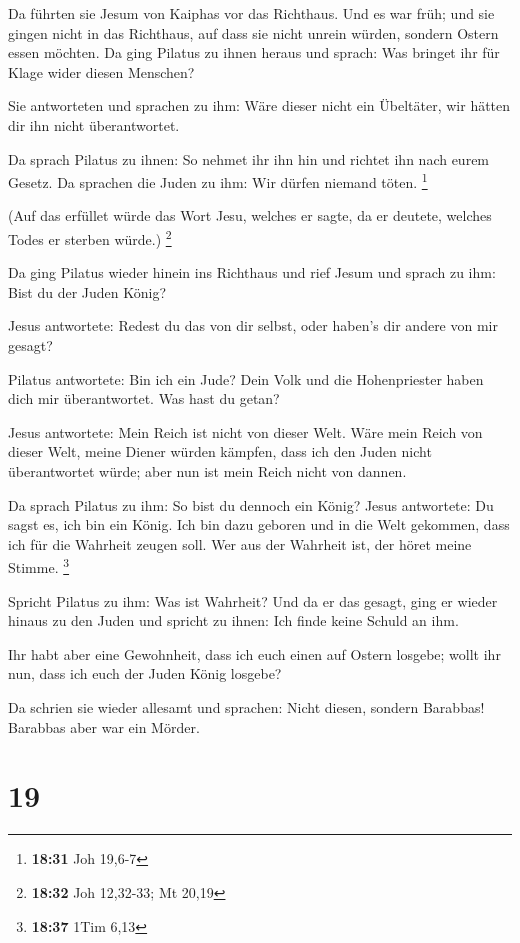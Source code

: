  Da führten sie Jesum von Kaiphas vor das Richthaus. Und
es war früh; und sie gingen nicht in das Richthaus, auf dass sie nicht
unrein würden, sondern Ostern essen möchten.  Da ging
Pilatus zu ihnen heraus und sprach: Was bringet ihr für Klage wider
diesen Menschen?

 Sie antworteten und sprachen zu ihm: Wäre dieser nicht
ein Übeltäter, wir hätten dir ihn nicht überantwortet.

 Da sprach Pilatus zu ihnen: So nehmet ihr ihn hin und
richtet ihn nach eurem Gesetz. Da sprachen die Juden zu ihm: Wir dürfen
niemand töten. \footnote{\textbf{18:31} Joh 19,6-7}

 (Auf das erfüllet würde das Wort Jesu, welches er sagte,
da er deutete, welches Todes er sterben würde.) \footnote{\textbf{18:32}
  Joh 12,32-33; Mt 20,19}

 Da ging Pilatus wieder hinein ins Richthaus und rief
Jesum und sprach zu ihm: Bist du der Juden König?

 Jesus antwortete: Redest du das von dir selbst, oder
haben's dir andere von mir gesagt?

 Pilatus antwortete: Bin ich ein Jude? Dein Volk und die
Hohenpriester haben dich mir überantwortet. Was hast du getan?

 Jesus antwortete: Mein Reich ist nicht von dieser Welt.
Wäre mein Reich von dieser Welt, meine Diener würden kämpfen, dass ich
den Juden nicht überantwortet würde; aber nun ist mein Reich nicht von
dannen.

 Da sprach Pilatus zu ihm: So bist du dennoch ein König?
Jesus antwortete: Du sagst es, ich bin ein König. Ich bin dazu geboren
und in die Welt gekommen, dass ich für die Wahrheit zeugen soll. Wer aus
der Wahrheit ist, der höret meine Stimme. \footnote{\textbf{18:37} 1Tim
  6,13}

 Spricht Pilatus zu ihm: Was ist Wahrheit? Und da er das
gesagt, ging er wieder hinaus zu den Juden und spricht zu ihnen: Ich
finde keine Schuld an ihm.

 Ihr habt aber eine Gewohnheit, dass ich euch einen auf
Ostern losgebe; wollt ihr nun, dass ich euch der Juden König losgebe?

 Da schrien sie wieder allesamt und sprachen: Nicht
diesen, sondern Barabbas! Barabbas aber war ein Mörder.

\hypertarget{section-18}{%
\section{19}\label{section-18}}

